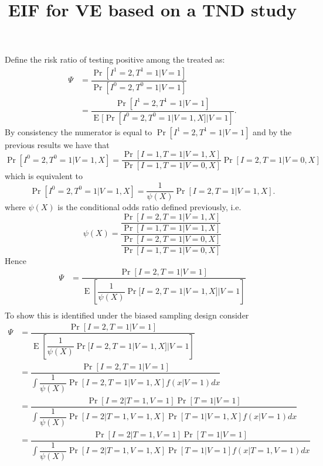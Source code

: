 \documentclass{article}
\title{EIF for VE based on a TND study}
\DeclareMathOperator{\E}{E}
\begin{document}
\maketitle


Define the risk ratio of testing positive among the treated as:
\begin{align*}
    \Psi &= \dfrac{\Pr[I^1 = 2, T^1 = 1 | V = 1]}{\Pr[I^0 = 2, T^0 = 1 | V = 1]} \\
         &= \dfrac{\Pr[I^1 = 2, T^1 = 1 | V = 1]}{\E[\Pr[I^0 = 2, T^0 = 1 | V = 1, X] | V = 1]}.
\end{align*}
By consistency the numerator is equal to $\Pr[I^1 = 2, T^1 = 1 | V = 1]$ and by the previous results we have that 
\begin{equation*}
    \Pr[I^0 = 2, T^0 = 1 | V = 1, X] = \dfrac{\Pr[I = 1, T = 1 | V = 1, X]}{\Pr[I = 1, T = 1 | V = 0, X]} \Pr[I = 2, T = 1 | V = 0, X]
\end{equation*}
which is equivalent to 
\begin{equation*}
    \Pr[I^0 = 2, T^0 = 1 | V = 1, X] = \dfrac{1}{\psi(X)} \Pr[I = 2, T = 1 | V = 1, X].
\end{equation*}
where $\psi(X)$ is the conditional odds ratio defined previously, i.e.
\begin{equation*}
    \psi(X) = \dfrac{\dfrac{\Pr[I = 2, T = 1 | V = 1, X]}{\Pr[I = 1, T = 1 | V = 1, X]}}{\dfrac{\Pr[I = 2, T = 1 | V = 0, X]}{\Pr[I = 1, T = 1 | V = 0, X]}}
\end{equation*}
Hence
\begin{align*}
    \Psi &= \dfrac{\Pr[I = 2, T = 1 | V = 1]}{\E\left[\dfrac{1}{\psi(X)} \Pr[I = 2, T = 1 | V = 1, X] | V = 1\right]} \\
\end{align*}
To show this is identified under the biased sampling design consider
\begin{align*}
    \Psi &= \dfrac{\Pr[I = 2, T = 1 | V = 1]}{\E\left[\dfrac{1}{\psi(X)} \Pr[I = 2, T = 1 | V = 1, X] | V = 1\right]} \\
    &= \dfrac{\Pr[I = 2, T = 1 | V = 1]}{\int \dfrac{1}{\psi(X)} \Pr[I = 2, T = 1 | V = 1, X] f(x | V = 1) dx} \\
    &= \dfrac{\Pr[I = 2 | T = 1, V = 1] \Pr[T = 1 | V = 1]}{\int \dfrac{1}{\psi(X)} \Pr[I = 2 | T = 1, V = 1, X] \Pr[T = 1 | V = 1, X]  f(x | V = 1) dx} \\
    &= \dfrac{\Pr[I = 2 | T = 1, V = 1] \Pr[T = 1 | V = 1]}{\int \dfrac{1}{\psi(X)} \Pr[I = 2 | T = 1, V = 1, X] \Pr[T = 1 | V = 1]  f(x | T = 1, V = 1) dx} \\
\end{align*}
\end{document}
